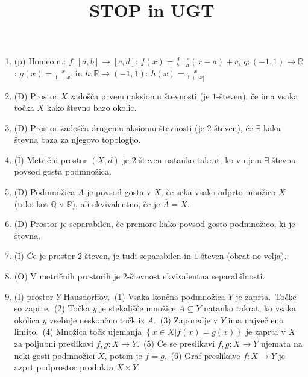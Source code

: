 \documentclass[10pt,a4paper]{article}
\title{STOP in UGT}
\author{}
\date{}
\begin{document}
\linespread{}

\setlength\lineskip{0pt}
        \begin{enumerate}
            
\item (p) Homeom.: $f: [a,b]\to[c,d]$: $f(x)=\frac{d-c}{b-a}(x-a)+c$,
$g: (-1,1)\to\mathbb{R}$: $g(x)=\frac{x}{1-|x|}$ in 
$h: \mathbb{R}\to(-1,1)$: $h(x)=\frac{x}{1+|x|}$
            
\item (D) Prostor $X$ zadošča prvemu aksiomu števnosti (je $1$-števen), če ima vsaka točka $X$ kako števno bazo okolic.
            
\item (D) Prostor zadošča drugemu aksiomu števnosti (je $2$-števen), če $\exists$ kaka števna baza za njegovo topologijo.
            
\item (I) Metrični prostor $(X,d)$ je $2$-števen natanko takrat, ko v njem $\exists$ števna povsod gosta podmnožica.
            
\item (D) Podmnožica $A$ je povsod gosta v $X$, če seka vsako odprto množico $X$ (tako kot $\mathbb{Q}$ v $\mathbb{R}$), ali ekvivalentno, če je $\overline{A}=X$.
            
\item (D) Prostor je separabilen, če premore kako povsod gosto podmnožico, ki je števna.
            
\item (I) Če je prostor $2$-števen, je tudi separabilen in $1$-števen (obrat ne velja).
            
\item (O) V metričnih prostorih je $2$-števnost ekvivalentna separabilnosti.
            
\item (I)  prostor $Y$ Hausdorffov.~(1) Vsaka končna podmnožica $Y$ je zaprta.~Točke so zaprte.~(2) Točka $y$ je stekališče množice $A\subseteq Y$ natanko takrat, ko vsaka okolica $y$ vsebuje neskončno točk iz $A$.~(3) Zaporedje v $Y$ ima največ eno limito.~(4) Množica točk ujemanja $\left\{x\in X | f(x)=g(x)\right\}$ je zaprta v $X$ za poljubni preslikavi $f,g: X\to Y$.~(5) Če se preslikavi $f,g: X\to Y$ ujemata na neki gosti podmnožici $X$, potem je $f=g$.~(6) Graf preslikave $f: X\to Y$ je azprt podprostor produkta $X\times Y$.
            

\end{enumerate}
\end{document}

